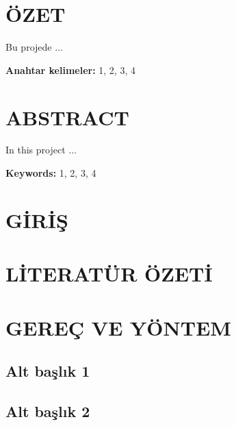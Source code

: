 \documentclass[11pt]{article}
\begin{document}
\section*{ÖZET}

\noindent

Bu projede $\ldots$

{\bf Anahtar kelimeler:} 1, 2, 3, 4

\newpage
\phantom{ss}
\vspace{-2.5cm}

\section*{ABSTRACT}


\noindent

In this project $\ldots$

{\bf Keywords:} 1, 2, 3, 4

\newpage


\renewcommand{\thesection}{\arabic{section}.}

\setcounter{page}{1}


\section{GİRİŞ}


\bigskip
\noindent

\lipsum[1-2]


\noindent

\clearpage
\section {LİTERATÜR ÖZETİ}


\lipsum[2-4]

\section{GEREÇ VE YÖNTEM} 



\subsection{Alt başlık 1}


\lipsum[4-5]

\subsection{Alt başlık 2}
\end{document}
